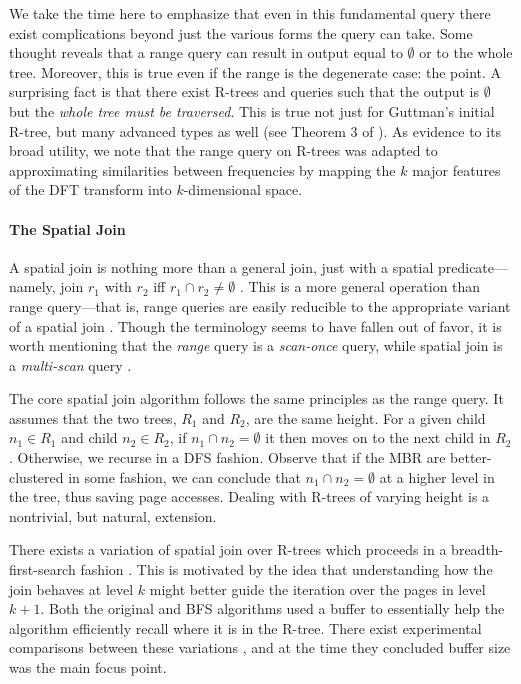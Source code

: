 We take the time here to emphasize that even in this fundamental query there exist complications beyond just the various forms the query can take.
Some thought reveals that a range query can result in output equal to $\emptyset$ or to the whole tree.
Moreover, this is true even if the range is the degenerate case: the point.
A surprising fact is that there exist R-trees and queries such that the output is $\emptyset$ but the \emph{whole tree must be traversed}.
This is true not just for Guttman's initial R-tree, but many advanced types as well (see Theorem 3 of \cite{argeberghaverkortyi04}).
As evidence to its broad utility, we note that the range query on R-trees was adapted to approximating similarities between frequencies \cite{agrawalfaloutsosswami93} by mapping the $k$ major features of the DFT transform into $k$-dimensional space.

\paragraph{The Spatial Join}
A spatial join is nothing more than a general join, just with a spatial predicate---namely, join $r_1$ with $r_2$ iff $r_1\cap r_2\neq\emptyset$ \cite{brinkhoffkriegelseeger93}.
This is a more general operation than range query---that is, range queries are easily reducible to the appropriate variant of a spatial join \cite{gaedegunther98}.
Though the terminology seems to have fallen out of favor, it is worth mentioning that the \emph{range} query is a \emph{scan-once} query, while spatial join is a \emph{multi-scan} query \cite{brinkhoffkriegelseeger93,samet90}.

The core spatial join algorithm \cite{brinkhoffkriegelseeger93} follows the same principles as the range query.
It assumes that the two trees, $R_1$ and $R_2$, are the same height.
For a given child $n_1\in R_1$ and child $n_2\in R_2$, if $n_1\cap n_2=\emptyset$ it then moves on to the next child in $R_2$.
Otherwise, we recurse in a DFS fashion.
Observe that if the MBR are better-clustered in some fashion, we can conclude that $n_1\cap n_2=\emptyset$ at a higher level in the tree, thus saving page accesses.
Dealing with R-trees of varying height is a nontrivial, but natural, extension.

There exists a variation of spatial join over R-trees which proceeds in a breadth-first-search fashion \cite{huangjingrundensteiner97}.
This is motivated by the idea that understanding how the join behaves at level $k$ might better guide the iteration over the pages in level $k+1$.
Both the original and BFS algorithms used a buffer to essentially help the algorithm efficiently recall where it is in the R-tree.
There exist experimental comparisons between these variations \cite{papadopoulosrigauxscholl99}, and at the time they concluded buffer size was the main focus point.


